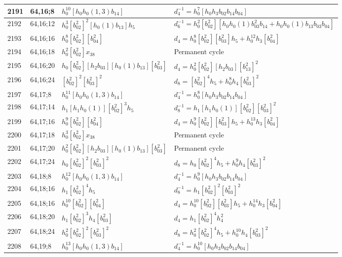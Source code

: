 \documentclass{article}
\begin{document}
\begin{longtable}{|l|l|>{\raggedright\arraybackslash}p{6cm}|>{\raggedright\arraybackslash}p{6cm}|}
\hline
2191 & 64,16;8 & $h_0^{10}[h_0h_0(1, 3)b_{14}]$ & $d_{4}^{-1}=h_0^7[h_0h_3b_{02}b_{14}b_{04}]$\\
\hline
2192 & 64,16;12 & $h_0^3[b_{02}^2]^2[h_0(1)b_{13}]h_5$ & $d_{6}^{-1}=h_0^2[b_{02}^2][h_0h_0(1)b_{03}^2b_{14} + h_0h_0(1)b_{13}b_{03}b_{04}]$\\
\hline
2193 & 64,16;16 & $h_0^8[b_{02}^2][b_{04}^2]$ &$d_{4}=h_0^8[b_{02}^2][b_{03}^2]h_5 + h_0^{12}h_3[b_{04}^2]$\\
\hline
2194 & 64,16;18 & $h_0^2[b_{02}^2]x_{38}$ & Permanent cycle\\
\hline
2195 & 64,16;20 & $h_0[b_{02}^2][h_2b_{03}][h_0(1)b_{13}][b_{03}^2]$ &$d_{4}=h_0^2[b_{02}^2][h_2b_{03}][b_{13}^2]^2$\\
\hline
2196 & 64,16;24 & $[b_{02}^2]^2[b_{03}^2]^2$ &$d_{8}=[b_{02}^2]^4h_5 + h_0^8h_4[b_{03}^2]^2$\\
\hline
2197 & 64,17;8 & $h_0^{11}[h_0h_0(1, 3)b_{14}]$ & $d_{4}^{-1}=h_0^8[h_0h_3b_{02}b_{14}b_{04}]$\\
\hline
2198 & 64,17;14 & $h_1[h_1h_0(1)][b_{02}^2]^3h_5$ & $d_{8}^{-1}=h_1[h_1h_0(1)][b_{02}^2][b_{03}^2]^2$\\
\hline
2199 & 64,17;16 & $h_0^9[b_{02}^2][b_{04}^2]$ &$d_{4}=h_0^9[b_{02}^2][b_{03}^2]h_5 + h_0^{13}h_3[b_{04}^2]$\\
\hline
2200 & 64,17;18 & $h_0^3[b_{02}^2]x_{38}$ & Permanent cycle\\
\hline
2201 & 64,17;20 & $h_0^2[b_{02}^2][h_2b_{03}][h_0(1)b_{13}][b_{03}^2]$ & Permanent cycle\\
\hline
2202 & 64,17;24 & $h_0[b_{02}^2]^2[b_{03}^2]^2$ &$d_{8}=h_0[b_{02}^2]^4h_5 + h_0^9h_4[b_{03}^2]^2$\\
\hline
2203 & 64,18;8 & $h_0^{12}[h_0h_0(1, 3)b_{14}]$ & $d_{4}^{-1}=h_0^9[h_0h_3b_{02}b_{14}b_{04}]$\\
\hline
2204 & 64,18;16 & $h_1[b_{02}^2]^4h_5$ & $d_{8}^{-1}=h_1[b_{02}^2]^2[b_{03}^2]^2$\\
2205 & 64,18;16 & $h_0^{10}[b_{02}^2][b_{04}^2]$ &$d_{4}=h_0^{10}[b_{02}^2][b_{03}^2]h_5 + h_0^{14}h_3[b_{04}^2]$\\
\hline
2206 & 64,18;20 & $h_1[b_{02}^2]^3h_4[b_{03}^2]$ &$d_{4}=h_1[b_{02}^2]^4h_4^2$\\
\hline
2207 & 64,18;24 & $h_0^2[b_{02}^2]^2[b_{03}^2]^2$ &$d_{8}=h_0^2[b_{02}^2]^4h_5 + h_0^{10}h_4[b_{03}^2]^2$\\
\hline
2208 & 64,19;8 & $h_0^{13}[h_0h_0(1, 3)b_{14}]$ & $d_{4}^{-1}=h_0^{10}[h_0h_3b_{02}b_{14}b_{04}]$\\

\end{longtable}
\end{document}
